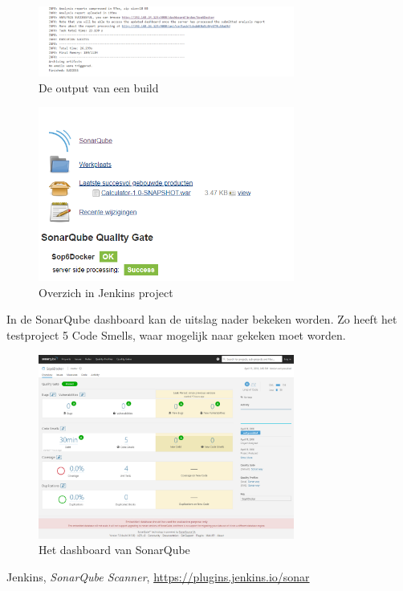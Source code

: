 \documentclass[12pt]{article}
\begin{document}
\begin{figure}[H]
	\begin{center}
		\includegraphics[width=0.75\textwidth]{images/succes.PNG}
		\caption{De output van een build\label{fig:succes}}
	\end{center}
\end{figure}

\begin{figure}[H]
	\begin{center}
		\includegraphics[width=0.75\textwidth]{images/overzichtjenkins.PNG}
		\caption{Overzich in Jenkins project\label{fig:overzichtjenkins}}
	\end{center}
\end{figure}

In de SonarQube dashboard kan de uitslag nader bekeken worden. Zo heeft het testproject 5 Code Smells, waar mogelijk naar gekeken moet worden.

\begin{figure}[H]
	\begin{center}
		\includegraphics[width=0.75\textwidth]{images/sonarqube_dashboard.png}
		\caption{Het dashboard van SonarQube\label{fig:succes}}
	\end{center}
\end{figure}


\begin{thebibliography}{9}
	Jenkins,
	\textit{SonarQube Scanner},
	\url{https://plugins.jenkins.io/sonar}
\end{thebibliography}
\end{document}
